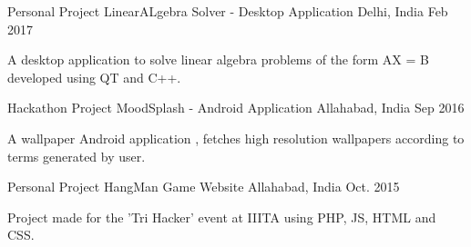 \begin{cventries}

\cventry
{Personal Project} %
{LinearALgebra Solver - Desktop Application} %
{Delhi, India} %
{Feb 2017} %
{ %
\begin{cvitems}
\item {A desktop application to solve linear algebra problems of the form AX = B developed using QT and C++.}
\end{cvitems}
}
\cventry
{Hackathon Project} %
{MoodSplash - Android Application} %
{Allahabad, India} %
{Sep 2016} %
{ %
\begin{cvitems}
\item {A wallpaper Android application , fetches high resolution
wallpapers according to terms generated by user.}
\end{cvitems}
}
\cventry
{Personal Project} %
{HangMan Game Website} %
{Allahabad, India} %
{Oct. 2015} %
{ %
\begin{cvitems}
\item {Project made for the 'Tri Hacker' event at IIITA using PHP, JS, HTML and CSS.}
\end{cvitems}
}

\end{cventries}